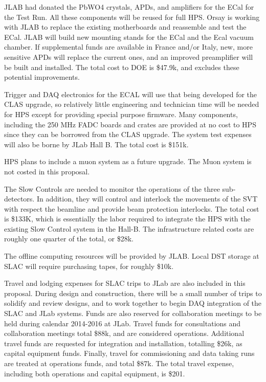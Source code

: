 JLAB had donated the PbWO4 crystals, APDs, and amplifiers for the ECal for the Test Run. All these components will be reused for full HPS. 
Orsay is working with JLAB to replace the existing motherboards and reassemble and test the ECal. JLAB will build new mounting stands for 
the ECal and the Ecal vacuum chamber. If supplemental funds are available in France and/or Italy, new, more sensitive APDs will replace 
the current ones, and an improved preamplifier will be built and installed. The total cost to DOE is \$47.9k, and excludes these potential improvements. 

Trigger and DAQ electronics for the ECAL will use that being developed for 
the CLAS upgrade, so relatively little engineering and technician time will be needed for HPS except 
for providing special purpose firmware. Many components, including the 250 MHz FADC boards and crates are provided at no cost to HPS  
since they can be borrowed from the CLAS upgrade. The system test expenses will also be borne by JLab Hall B. The total cost 
is \$151k. 

HPS plans to include a muon system as a future upgrade. The Muon system is not costed in this proposal.

The Slow Controls are needed to monitor the operations of the three sub-detectors. In addition, they will control and interlock the 
movements of the SVT with respect the beamline and provide beam protection interlocks. The total cost is \$133K, which is essentially 
the labor required to integrate the HPS with the existing Slow Control system in the Hall-B. The infrastructure related costs are roughly
one quarter of the total, or \$28k.

The offline computing resources will be provided by JLAB. Local DST storage at SLAC will require purchasing tapes, for roughly \$10k. 

Travel and lodging expenses for SLAC trips to JLab are also included in this proposal. During design and construction, 
there will be a small number of trips to solidify and review designs, and to work together to begin DAQ integration of the SLAC 
and JLab systems. Funds are also reserved for collaboration meetings to be held during calendar 2014-2016 at JLab. Travel funds for
consultations and collaboration meetings total \$88k, and are considered operations. Additional travel funds are requested for integration 
and installation, totalling \$26k, as capital equipment funds. Finally, travel for commissioning and data taking runs are treated at operations 
funds, and total \$87k. The total travel expense, including both operations and capital equipment, is \$201.

